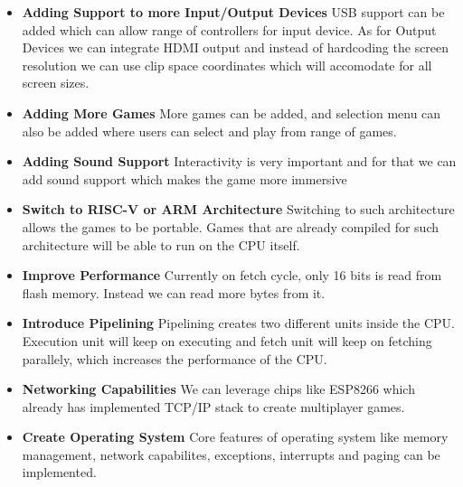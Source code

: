 \documentclass[a4paper,12pt]{article}
\begin{document}
    \begin{itemize}
        \item \textbf{Adding Support to more Input/Output Devices} USB support can be added which can allow range of controllers for input device. As for Output Devices we can integrate HDMI output and instead of hardcoding the screen resolution we can use clip space coordinates which will accomodate for all screen sizes. 
        \item \textbf{Adding More Games} More games can be added, and selection menu can also be added where users can select and play from range of games.
        \item \textbf{Adding Sound Support} Interactivity is very important and for that we can add sound support which makes the game more immersive 
        \item \textbf{Switch to RISC-V or ARM Architecture} Switching to such architecture allows the games to be portable. Games that are already compiled for such architecture will be able to run on the CPU itself.
        \item \textbf{Improve Performance} Currently on fetch cycle, only 16 bits is read from flash memory. Instead we can read more bytes from it.
        \item \textbf{Introduce Pipelining} Pipelining creates two different units inside the CPU. Execution unit will keep on executing and fetch unit will keep on fetching parallely, which increases the performance of the CPU.
        \item \textbf{Networking Capabilities} We can leverage chips like ESP8266 which already has implemented TCP/IP stack to create multiplayer games. 
        \item \textbf{Create Operating System} Core features of operating system like memory management, network capabilites, exceptions, interrupts and paging can be implemented. 
    \end{itemize}




\end{document}
